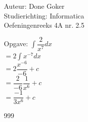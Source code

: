 \documentclass[a4paper]{article}
\begin{document}
  
\noindent \large Auteur: Done Goker \\
\noindent \large Studierichting: Informatica\\
\noindent \large Oefeningenreeks 4A nr. 2.5\\

\medskip

\normalsize

Opgave:
$\displaystyle\int \dfrac{2}{x^7}dx$ \\

$ = 2\displaystyle\int x^{-7}dx$ \\

$ = 2\dfrac{x^{-6}}{-6} + c $  \\

$ = \dfrac{2}{-6} \dfrac{1}{x^6} +c$ \\

$ = \dfrac{-1}{3x^6} +c$ \\



\begin{thebibliography}{999}
\end{thebibliography}
\end{document}
